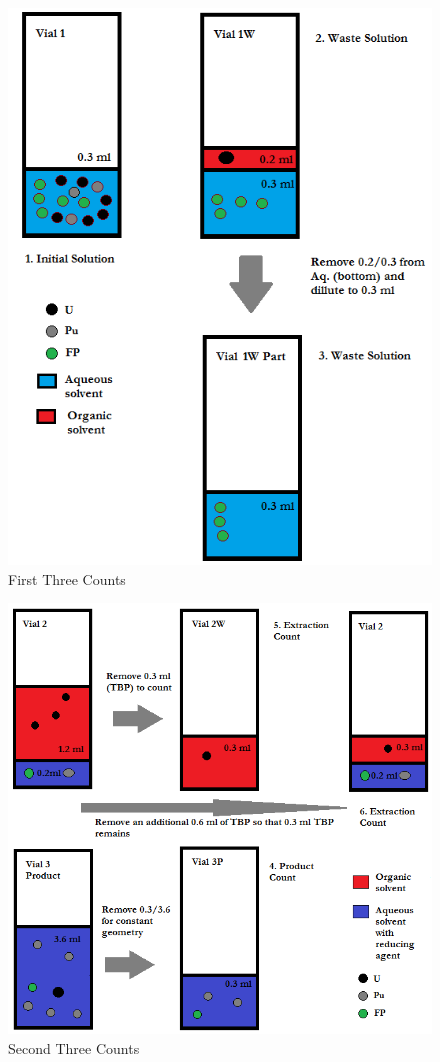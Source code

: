 \documentclass[idxtotoc,hyperref,openany,oneside]{labbook} %
\begin{document}
\begin{figure}[H] %
\begin{center}
  \includegraphics[width=0.5\linewidth]
                  {Figures/Extraction_Process_1_First_3_Counts}
\end{center}
\caption{First Three Counts}
\label{fig:example1}
\end{figure}

\begin{figure}[H] %
\begin{center}
  \includegraphics[width=0.5\linewidth]
                  {Figures/Back_Extraction_Process_1_Last_3_Counts}
\end{center}
\caption{Second Three Counts}
\label{fig:example2}
\end{figure}


\end{document}
